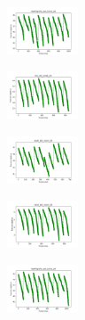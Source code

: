 \begin{figure}[H]
\begin{subfigure}
    \end{subfigure}
    \hfill
    \begin{subfigure}
        \centering
        \includegraphics[width=0.234\textwidth]{img/bmb/newthyroid_set_const_20_277451237_cost.png}
    \end{subfigure}
    \hfill
    \begin{subfigure}
        \centering
        \includegraphics[width=0.234\textwidth]{img/bmb/iris_set_const_20_49258669_cost.png}
    \end{subfigure}
    \hfill
    \begin{subfigure}
        \centering
        \includegraphics[width=0.234\textwidth]{img/bmb/ecoli_set_const_20_49258669_cost.png}
    \end{subfigure}
    \hfill
    \begin{subfigure}
        \centering
        \includegraphics[width=0.234\textwidth]{img/bmb/rand_set_const_20_49258669_cost.png}
    \end{subfigure}
    \hfill
    \begin{subfigure}
        \centering
        \includegraphics[width=0.234\textwidth]{img/bmb/newthyroid_set_const_20_49258669_cost.png}
    \end{subfigure}
    \hfill
    \begin{subfigure}

\end{subfigure}
\end{figure}
